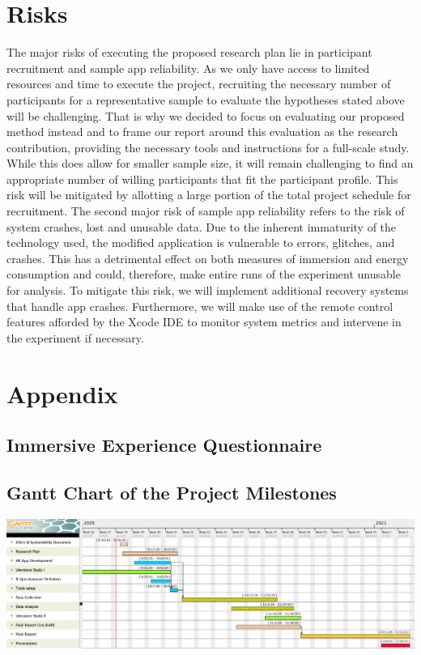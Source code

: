 \documentclass[12pt,twoside,english]{article}
\begin{document}
\section{Risks}
\label{sect:risks}
The major risks of executing the proposed research plan lie in participant recruitment and sample app reliability.
As we only have access to limited resources and time to execute the project, recruiting the necessary number of participants for a representative sample to evaluate the hypotheses stated above will be challenging.
That is why we decided to focus on evaluating our proposed method instead and to frame our report around this evaluation as the research contribution, providing the necessary tools and instructions for a full-scale study.
While this does allow for smaller sample size, it will remain challenging to find an appropriate number of willing participants that fit the participant profile.
This risk will be mitigated by allotting a large portion of the total project schedule for recruitment.
The second major risk of sample app reliability refers to the risk of system crashes, lost and unusable data.
Due to the inherent immaturity of the technology used, the modified application is vulnerable to errors, glitches, and crashes.
This has a detrimental effect on both measures of immersion and energy consumption and could, therefore, make entire runs of the experiment unusable for analysis. 
To mitigate this risk, we will implement additional recovery systems that handle app crashes.
Furthermore, we will make use of the remote control features afforded by the Xcode \gls{IDE} to monitor system metrics and intervene in the experiment if necessary.



% 


\appendix
\section{Appendix}
\label{sect:appendix}

\subsection{Immersive Experience Questionnaire}
\label{sect:ieq}


\subsection{Gantt Chart of the Project Milestones}
\label{sect:gantt_chart}

\includegraphics[width=\textwidth]{imgs/project_milestones}

\clearpage
\end{document}
